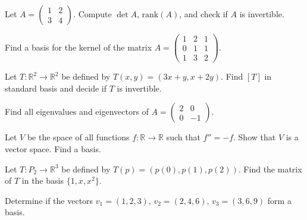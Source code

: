 \documentclass[11pt]{article}
\begin{document}
\begin{problem}
Let $A = \begin{pmatrix}1 & 2 \\ 3 & 4\end{pmatrix}$. Compute $\det A$, $\mathrm{rank}(A)$, and check if $A$ is invertible.
\end{problem}

\begin{problem}
Find a basis for the kernel of the matrix $A = \begin{pmatrix}1 & 2 & 1 \\ 0 & 1 & 1 \\ 1 & 3 & 2\end{pmatrix}$.
\end{problem}

\begin{problem}
Let $T: \mathbb{R}^2 \to \mathbb{R}^2$ be defined by $T(x, y) = (3x + y, x + 2y)$. Find $[T]$ in standard basis and decide if $T$ is invertible.
\end{problem}

\begin{problem}
Find all eigenvalues and eigenvectors of $A = \begin{pmatrix}2 & 0 \\ 0 & -1\end{pmatrix}$.
\end{problem}

\begin{problem}
Let $V$ be the space of all functions $f:\mathbb{R}\to\mathbb{R}$ such that $f'' = -f$. Show that $V$ is a vector space. Find a basis.
\end{problem}

\begin{problem}
Let $T: P_2 \to \mathbb{R}^3$ be defined by $T(p) = (p(0), p(1), p(2))$. Find the matrix of $T$ in the basis $\{1, x, x^2\}$.
\end{problem}

\begin{problem}
Determine if the vectors $v_1 = (1,2,3)$, $v_2 = (2,4,6)$, $v_3 = (3,6,9)$ form a basis.
\end{problem}
\end{document}
